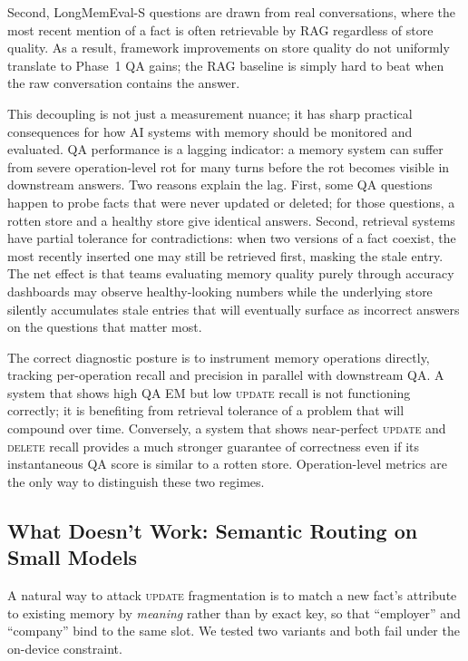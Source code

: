 \documentclass[10pt, twocolumn]{article}
\begin{document}
Second, LongMemEval-S questions are drawn from real conversations, where the
most recent mention of a fact is often retrievable by RAG regardless of
store quality.
As a result, framework improvements on store quality do not uniformly
translate to Phase~1 QA gains; the RAG baseline is simply hard to beat
when the raw conversation contains the answer.

This decoupling is not just a measurement nuance; it has sharp practical
consequences for how AI systems with memory should be monitored and
evaluated. QA performance is a lagging indicator: a memory system can
suffer from severe operation-level rot for many turns before the rot
becomes visible in downstream answers. Two reasons explain the lag.
First, some QA questions happen to probe facts that were never updated or
deleted; for those questions, a rotten store and a healthy store give
identical answers. Second, retrieval systems have partial tolerance for
contradictions: when two versions of a fact coexist, the most recently
inserted one may still be retrieved first, masking the stale entry.
The net effect is that teams evaluating memory quality purely through
accuracy dashboards may observe healthy-looking numbers while the underlying
store silently accumulates stale entries that will eventually surface as
incorrect answers on the questions that matter most.

The correct diagnostic posture is to instrument memory operations
directly, tracking per-operation recall and precision in parallel with
downstream QA. A system that shows high QA EM but low \textsc{update}
recall is not functioning correctly; it is benefiting from retrieval
tolerance of a problem that will compound over time. Conversely, a
system that shows near-perfect \textsc{update} and \textsc{delete}
recall provides a much stronger guarantee of correctness even if its
instantaneous QA score is similar to a rotten store.
Operation-level metrics are the only way to distinguish these two regimes.

\subsection{What Doesn't Work: Semantic Routing on Small Models}
\label{sec:semantic}

A natural way to attack \textsc{update} fragmentation is to match a new fact's
attribute to existing memory by \emph{meaning} rather than by exact key, so that
``employer'' and ``company'' bind to the same slot. We tested two variants and
both fail under the on-device constraint.
\end{document}
